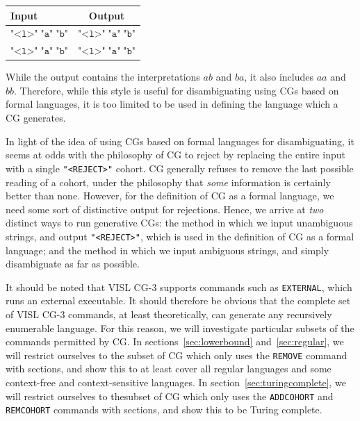 \documentclass[11pt]{article}
\def\t#1{\texttt{#1}}
\begin{document}
\begin{center}
  \begin{tabular}{l|c}
    \textbf{Input}                  & \textbf{Output} \\ \hline
    \(\t{"<l>"}\;\t{"a"}\;\t{"b"}\) & \(\t{"<l>"}\;\t{"a"}\;\t{"b"}\) \\
    \(\t{"<l>"}\;\t{"a"}\;\t{"b"}\) & \(\t{"<l>"}\;\t{"a"}\;\t{"b"}\) \\
  \end{tabular}
\end{center}
While the output contains the interpretations $ab$ and $ba$, it also includes
$aa$ and $bb$. Therefore, while this style is useful for disambiguating using
CGs based on formal languages, it is too limited to be used in defining the
language which a CG generates.

In light of the idea of using CGs based on formal languages for disambiguating,
it seems at odds with the philosophy of CG to reject by replacing the entire
input with a single \t{"<REJECT>"} cohort. CG generally refuses to remove the
last possible reading of a cohort, under the philosophy that \emph{some}
information is certainly better than none.
However, for the definition of CG as a formal language, we need some sort of
distinctive output for rejections. Hence, we arrive at \emph{two} distinct ways
to run generative CGs: the method in which we input unambiguous strings, and
output \t{"<REJECT>"}, which is used in the definition of CG as a formal
language; and the method in which we input ambiguous strings, and simply
disambiguate as far as possible. 

It should be noted that VISL CG-3 \cite{bick2015,vislcg3} supports commands 
such as \t{EXTERNAL}, which runs an external executable. It should therefore 
be obvious that the complete set of VISL CG-3 commands, at least theoretically,
can generate any recursively enumerable language. For this reason, we will
investigate particular subsets of the commands permitted by CG.
In sections~\ref{sec:lowerbound} and~\ref{sec:regular}, we will restrict
ourselves to the subset of CG which only uses the \t{REMOVE} command with
sections, and show this to at least cover all regular languages and some
context-free and context-sensitive languages.
In section~\ref{sec:turingcomplete}, we will restrict ourselves to thesubset of
CG which only uses the \t{ADDCOHORT} and \t{REMCOHORT} commands with sections,
and show this to be Turing complete.
\end{document}
